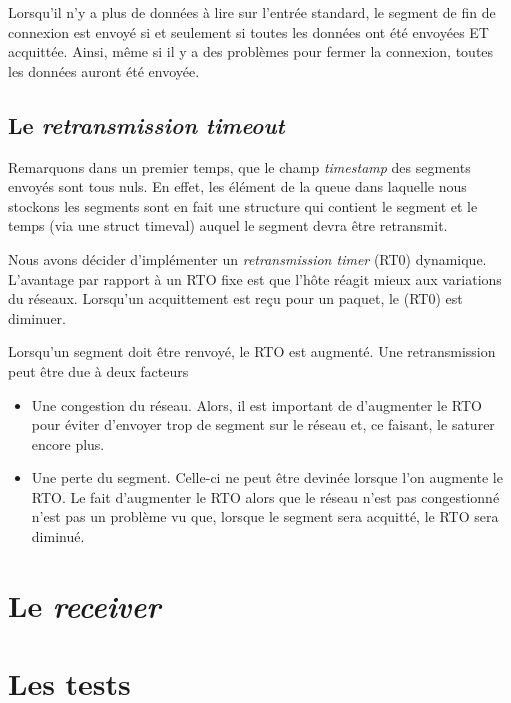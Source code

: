 \documentclass[12pt,notitlepage]{report}
\begin{document}
	Lorsqu'il n'y a plus de données à lire sur l'entrée standard, le segment de fin de connexion est envoyé si et seulement si toutes les données ont été envoyées ET acquittée. Ainsi, même si il y a des problèmes pour fermer la connexion, toutes les données auront été envoyée.
	
	\subsection{Le \textit{retransmission timeout}}
	
	Remarquons dans un premier temps, que le champ \textit{timestamp} des segments envoyés sont tous nuls. En effet, les élément de la queue dans laquelle nous stockons les segments sont en fait une structure qui contient le segment et le temps (via une struct timeval) auquel le segment devra être retransmit.
	
	Nous avons décider d'implémenter un \textit{retransmission timer} (RT0) dynamique. L'avantage par rapport à un RTO fixe est que l'hôte réagit mieux aux variations du réseaux. Lorsqu'un acquittement est reçu pour un paquet, le (RT0) est diminuer. 
	
	Lorsqu'un segment doit être renvoyé, le RTO est augmenté. Une retransmission peut être due à deux facteurs
	\begin{itemize}
		\item Une congestion du réseau. Alors, il est important de d'augmenter le RTO pour éviter d'envoyer trop de segment sur le réseau et, ce faisant, le saturer encore plus.
		\item Une perte du segment. Celle-ci ne peut être devinée lorsque l'on augmente le RTO. Le fait d'augmenter le RTO alors que le réseau n'est pas congestionné n'est pas un problème vu que, lorsque le segment sera acquitté, le RTO sera diminué.
	\end{itemize}
	
	\section{Le \textit{receiver}}
	
	\section{Les tests}
\end{document}
